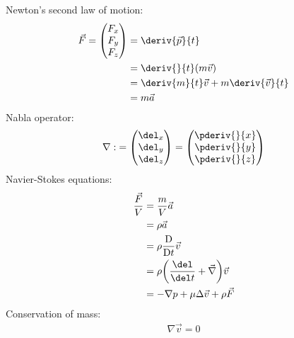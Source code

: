 \documentclass[11 pt]{article}
\begin{document}
    Newton's second law of motion:
    \begin{align*}
        \vec F=\begin{pmatrix}F_x \\ F_y \\ F_z \end{pmatrix} 
        &=\deriv{\vec p}{t} \\
        &=\deriv{}{t}(m\vec v) \\
        &=\deriv{m}{t}\vec v+m\deriv{\vec v}{t} \\
        &=m\vec a    
    \end{align*}
    Nabla operator:
    \begin{align*}
        \nabla:
        &=\begin{pmatrix}\del_x \\ \del_y \\ \del_z \end{pmatrix}
        =\begin{pmatrix}\pderiv{}{x} \\ \pderiv{}{y} \\ \pderiv{}{z} \end{pmatrix} \\
    \end{align*}
    Navier-Stokes equations:
    \begin{align*}
        \frac{\vec F}{V}
        &=\frac{m}{V}\vec a \\
        &=\rho\vec a \\
        &=\rho\frac{\text D}{\text Dt}\vec v \\
        &=\rho\bigg(\frac{\del}{\del t}+\vec\nabla\bigg)\vec v \\
        &=-\nabla p+\mu\Delta\vec v+\rho\vec F
    \end{align*}
    Conservation of mass:
    \begin{align*}
        \nabla\vec v=0 
    \end{align*}
\end{document}

